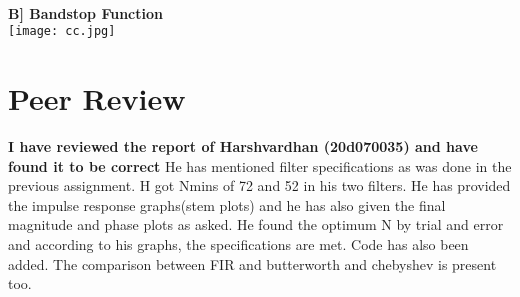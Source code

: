 \documentclass[12pt]{article}
\begin{document}
\\\textbf{B] Bandstop Function}
    \\\texttt{[image: cc.jpg]}


\section{Peer Review}
\textbf{I have reviewed the report of Harshvardhan (20d070035) and have found it to be correct} He has mentioned filter specifications as was done in the previous assignment. H got Nmins of 72 and 52 in his two filters. He has provided the impulse response graphs(stem plots) and he has also given the final magnitude and phase plots as asked. He found the optimum N by trial and error and according to his graphs, the specifications are met. Code has also been added. The comparison between FIR and butterworth and chebyshev is present too.
\end{document}

